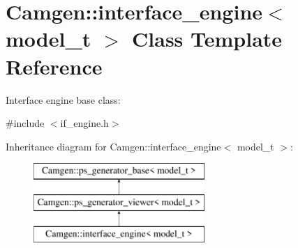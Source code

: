 \hypertarget{a00314}{\section{Camgen\-:\-:interface\-\_\-engine$<$ model\-\_\-t $>$ Class Template Reference}
\label{a00314}
}


Interface engine base class\-:  




{\ttfamily \#include $<$if\-\_\-engine.\-h$>$}

Inheritance diagram for Camgen\-:\-:interface\-\_\-engine$<$ model\-\_\-t $>$\-:\begin{figure}[H]
\begin{center}
\leavevmode
\includegraphics[height=3.000000cm]{a00314}
\end{center}
\end{figure}
